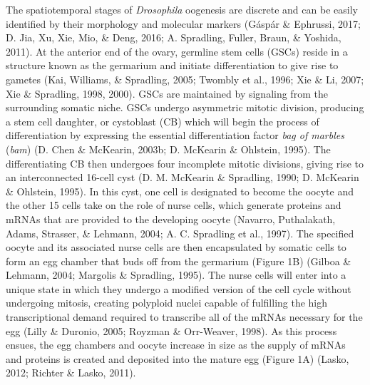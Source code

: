 \documentclass[12pt,oneside]{reedthesis}
\begin{document}
The spatiotemporal stages of \emph{Drosophila} oogenesis are discrete and can
be easily identified by their morphology and molecular markers
(Gáspár \& Ephrussi, 2017; D. Jia, Xu, Xie, Mio, \& Deng, 2016; A. Spradling, Fuller, Braun, \& Yoshida, 2011). At the anterior end of
the ovary, germline stem cells (GSCs) reside in a structure known as the
germarium and initiate differentiation to give rise to gametes
(Kai, Williams, \& Spradling, 2005; Twombly et al., 1996; Xie \& Li, 2007; Xie \& Spradling, 1998, 2000). GSCs
are maintained by signaling from the surrounding somatic niche. GSCs
undergo asymmetric mitotic division, producing a stem cell daughter, or
cystoblast (CB) which will begin the process of differentiation by
expressing the essential differentiation factor \emph{bag of marbles} (\emph{bam})
(D. Chen \& McKearin, 2003b; D. McKearin \& Ohlstein, 1995). The differentiating CB then undergoes
four incomplete mitotic divisions, giving rise to an interconnected
16-cell cyst (D. M. McKearin \& Spradling, 1990; D. McKearin \& Ohlstein, 1995). In this cyst, one
cell is designated to become the oocyte and the other 15 cells take on
the role of nurse cells, which generate proteins and mRNAs that are
provided to the developing oocyte (Navarro, Puthalakath, Adams, Strasser, \& Lehmann, 2004; A. C. Spradling et al., 1997).
The specified oocyte and its associated nurse cells are then
encapsulated by somatic cells to form an egg chamber that buds off from
the germarium (Figure 1B) (Gilboa \& Lehmann, 2004; Margolis \& Spradling, 1995). The nurse
cells will enter into a unique state in which they undergo a modified
version of the cell cycle without undergoing mitosis, creating polyploid
nuclei capable of fulfilling the high transcriptional demand required to
transcribe all of the mRNAs necessary for the egg (Lilly \& Duronio, 2005; Royzman \& Orr-Weaver, 1998). As this process ensues, the egg chambers and oocyte
increase in size as the supply of mRNAs and proteins is created and
deposited into the mature egg (Figure 1A) (Lasko, 2012; Richter \& Lasko, 2011).
\end{document}
